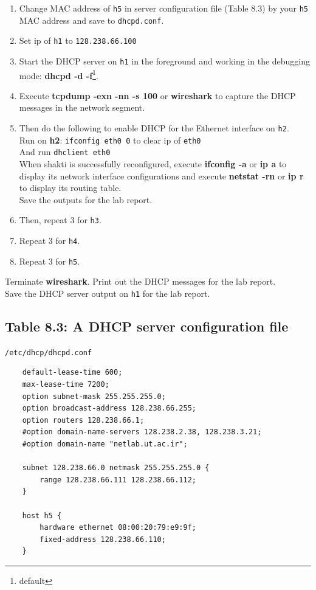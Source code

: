\documentclass[10pt,a4paper]{article}
\numberwithin{equation}{section}
\numberwithin{figure}{section}
\numberwithin{table}{section}
\begin{document}
    \begin{enumerate}
        \item Change MAC address of \texttt{h5} in server configuration file (Table 8.3) by your \texttt{h5} MAC address and save to \texttt{dhcpd.conf}.
        \item Set ip of \texttt{h1} to \texttt{128.238.66.100}
        \item Start the DHCP server on \texttt{h1} in the foreground and working in the debugging mode: \textbf{dhcpd -d -f}\footnote{default }.
        \item Execute \textbf{tcpdump -exn -nn -s 100} or \textbf{wireshark} to capture the DHCP messages in the network segment.
        \item Then do the following to enable DHCP for the Ethernet interface on \texttt{h2}. \\
        Run on \textbf{h2}: \texttt{ifconfig eth0 0} to clear ip of \texttt{eth0}\\
        And run \texttt{dhclient eth0}\\
        When shakti is successfully reconfigured, execute \textbf{ifconfig -a} or \textbf{ip a} to display its
        network interface configurations and execute \textbf{netstat -rn} or \textbf{ip r} to display its routing table.\\
        Save the outputs for the lab report.
        \item Then, repeat 3 for \texttt{h3}.
        \item Repeat 3 for \texttt{h4}.
        \item Repeat 3 for \texttt{h5}.
    \end{enumerate}
    Terminate \textbf{wireshark}. Print out the DHCP messages for the lab report. \\
    Save the DHCP server output on \texttt{h1} for the lab report.

    \subsection*{Table 8.3: A DHCP server configuration file}
    \texttt{/etc/dhcp/dhcpd.conf}
    \begin{verbatim}
    default-lease-time 600;
    max-lease-time 7200;
    option subnet-mask 255.255.255.0;
    option broadcast-address 128.238.66.255;
    option routers 128.238.66.1;
    #option domain-name-servers 128.238.2.38, 128.238.3.21;
    #option domain-name "netlab.ut.ac.ir";

    subnet 128.238.66.0 netmask 255.255.255.0 {
        range 128.238.66.111 128.238.66.112;
    }

    host h5 {
        hardware ethernet 08:00:20:79:e9:9f;
        fixed-address 128.238.66.110;
    }
    \end{verbatim}
\end{document}
